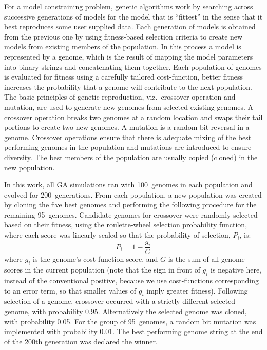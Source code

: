 For a model constraining problem, genetic algorithms work by searching
across successive generations of models for the model that is
``fittest'' in the sense that it best reproduces some user supplied
data. Each generation of models is obtained from the previous one by
using fitness-based selection criteria to create new models from
existing members of the population. In this process a model is
represented by a genome, which is the result of mapping the model
parameters into binary strings and concatenating them together. Each
population of genomes is evaluated for fitness using a carefully
tailored cost-function, better fitness increases the probability that
a genome will contribute to the next population.  The basic principles
of genetic reproduction, viz.\ crossover operation and mutation, are
used to generate new genomes from selected existing genomes. A
crossover operation breaks two genomes at a random location and swaps
their tail portions to create two new genomes. A mutation is a random
bit reversal in a genome. Crossover operations ensure that there is
adequate mixing of the best performing genomes in the population and
mutations are introduced to ensure diversity. The best members of the
population are usually copied (cloned) in the new population.

\medskip{} 

In this work, all GA simulations ran with 100~genomes in each
population and evolved for 200~generations. From each population, a
new population was created by cloning the five best genomes and
performing the following procedure for the remaining 95~genomes.
Candidate genomes for crossover were randomly selected based on their
fitness, using the roulette-wheel selection probability function,
where each score was linearly scaled so that the probability of
selection, $P_i$, is:
\begin{equation} \label{eq:GA:1} 
P_{i} =1 - \frac{g_{i} }{G}
\end{equation}
\noindent where $g_i$ is the genome's cost-function score, and $G$ is
the sum of all genome scores in the current population (note that the
sign in front of $g_i$ is negative here, instead of the conventional
positive, because we use cost-functions corresponding to an error
term, so that smaller values of $g_i$ imply greater
fitness). Following selection of a genome, crossover occurred with a
strictly different selected genome, with probability 0.95.
Alternatively the selected genome was cloned, with probability 0.05.
For the group of 95~genomes, a random bit mutation was implemented
with probability 0.01. The best performing genome string at the end of
the 200th generation was declared the winner.

